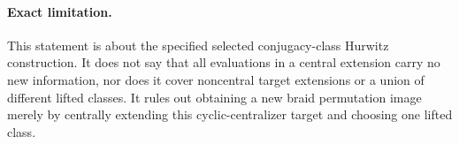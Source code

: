 \paragraph{Exact limitation.}
This statement is about the specified selected
conjugacy-class Hurwitz construction. It does not say
that all evaluations in a central extension carry no
new information, nor does it cover noncentral target
extensions or a union of different lifted classes.
It rules out obtaining a new braid permutation image
merely by centrally extending this cyclic-centralizer
target and choosing one lifted class.
